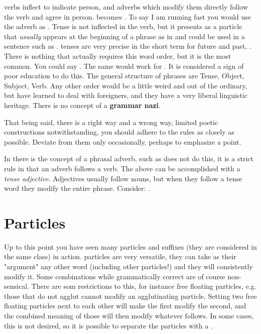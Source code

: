 \klingonl verbs inflect to indicate person, and adverbs which modify them directly follow the verb and agree in person.  becomes . To say I am running fast you would use the adverb  as . Tense is not inflected in the verb, but it presents as a particle that \textit{usually} appears at the beginning of a phrase as in  and could be used in a sentence such as . \klingonl tenses are very precise in the short term for future and past, . There is nothing that actually requires this word order, but it is the most common. You could say . The same would work for . It is considered a sign of poor education to do this. The general structure of \klingonl phrases are Tense, Object, Subject, Verb. Any other order would be a little weird and out of the ordinary, but \klingons have learned to deal with foreigners, and they have a very liberal linguistic heritage. There is no \klingon concept of a \textbf{grammar nazi}.

That being said, there is a right way and a wrong way, limited poetic constructions notwithstanding, you should adhere to the rules as closely as possible. Deviate from them only occasionally, perhaps to emphasize a point.

In \english there is the concept of a phrasal adverb, such as  \klingonl does not do this, it is a strict rule in \klingonl that an adverb follows a verb. The above can be accomplished with a \textit{tense adjective}. Adjectives usually follow nouns, but when they follow a tense word they modify the entire phrase. Consider: .

\section*{Particles}

Up to this point you have seen many particles and suffixes (they are considered in the same class) in action. \klingonl particles are very versatile, they can take as their "argument" any other \klingonl word (including other particles!) and they will consistently modify it. Some combinations while grammatically correct are of course non-sensical. There are som restrictions to this, for instance free floating particles, e.g. those that do not agglut cannot modify an agglutinating particle. Setting two free floating particles next to each other will make the first modify the second, and the combined meaning of those will then modify whatever follows. In some cases, this is not desired, so it is possible to separate the particles with a .